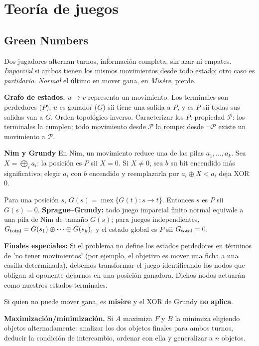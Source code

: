 \section{Teoría de juegos}

\subsection{Green Numbers}
Dos jugadores alternan turnos, información completa, sin azar ni empates. \textit{Imparcial} si ambos tienen los mismos movimientos desde todo estado; otro caso es \textit{partidario}. \textit{Normal} el último en mover gana, en \textit{Misère}, pierde.

\textbf{Grafo de estados.} $u\to v$ representa un movimiento. Los terminales son perdedores ($P$); $u$ es ganador ($G$) sii tiene una salida a $P$, y es $P$ sii todas sus salidas van a $G$. Orden topológico inverso. Caracterizar los $P$: propiedad $\mathcal P$: los terminales la cumplen; todo movimiento desde $\mathcal P$ la rompe; desde $\neg\mathcal P$ existe un movimiento a $\mathcal P$.

\textbf{Nim y Grundy}
En Nim, un movimiento reduce una de las pilas $a_1,\dots,a_k$. Sea $X=\bigoplus_i a_i$: la posición es $P$ sii $X=0$. Si $X\ne0$, sea $b$ su bit encendido más significativo; elegir $a_i$ con $b$ encendido y reemplazarla por $a_i\oplus X<a_i$ deja XOR $0$.

Para una posición $s$, $G(s)=\operatorname{mex}\{G(t):s\to t\}$.
Entonces $s$ es $P$ sii $G(s)=0$. \textbf{Sprague--Grundy:} todo juego imparcial finito normal equivale a una pila de Nim de tamaño $G(s)$; para juegos independientes,
$
G_{\rm total}=G(s_1)\oplus\cdots\oplus G(s_k),
$
y el estado global es $P$ sii $G_{\rm total}=0$. 

\textbf{Finales especiales:}  
Si el problema no define los estados perdedores en términos de 'no tener movimientos' (por ejemplo, el objetivo es mover una ficha a una casilla determinada), debemos transformar el juego identificando los nodos que obligan al oponente dejarnos en una posición ganadora. Dichos nodos actuarán como nuestros estados terminales. 

Si quien no puede mover gana, es \textbf{misère} y el XOR de Grundy \textbf{no aplica}.


\textbf{Maximización/minimización.} Si $A$ maximiza $F$ y $B$ la minimiza eligiendo objetos alternadamente: analizar los dos objetos finales para ambos turnos, deducir la condición de intercambio, ordenar con ella y generalizar a $n$ objetos.

